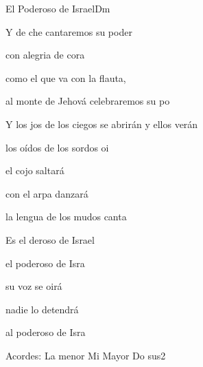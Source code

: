 \documentclass[12pt, spanish]{book}
\begin{document}
\begin{song}{El Poderoso de Israel}{Dm}
\begin{SBExtraKeys}
{            



            \begin{SBOpGroup}
                Y de che cantaremos su poder

                con alegria de cora

                como el que va con la flauta,

                al monte de Jehová celebraremos su po
            \end{SBOpGroup}
            \vskip 20pt
            \begin{SBOpGroup}
                Y los jos de los ciegos se abrirán y ellos verán

                los oídos de los sordos oi

                el cojo saltará

                con el arpa danzará

                la lengua de los mudos canta
            \end{SBOpGroup}

            \begin{SBChorus}
                Es el deroso de Israel

                el poderoso de Isra

                su voz se oirá

                nadie lo detendrá

                al poderoso de Isra
            \end{SBChorus}

            \ifChordBk
            \begin{SBOpGroup}
                Acordes:
                \upchord{\Am}La menor \hfill
                \upchord{\E}\qquad Mi Mayor \hfill\null\break
                \upchord{\Csustwo}\qquad Do sus2 \hfill\null\break
            \end{SBOpGroup}
            \fi
        }\end{SBExtraKeys}
    \end{song}
\end{document}

